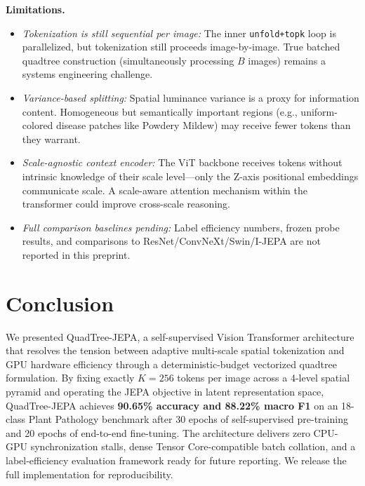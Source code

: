 \documentclass[10pt,twocolumn,letterpaper]{article}
\begin{document}
\textbf{Limitations.}
\begin{itemize}
    \item \textit{Tokenization is still sequential per image:} The inner \texttt{unfold+topk} loop is parallelized, but tokenization still proceeds image-by-image. True batched quadtree construction (simultaneously processing $B$ images) remains a systems engineering challenge.
    \item \textit{Variance-based splitting:} Spatial luminance variance is a proxy for information content. Homogeneous but semantically important regions (e.g., uniform-colored disease patches like Powdery Mildew) may receive fewer tokens than they warrant.
    \item \textit{Scale-agnostic context encoder:} The ViT backbone receives tokens without intrinsic knowledge of their scale level—only the Z-axis positional embeddings communicate scale. A scale-aware attention mechanism within the transformer could improve cross-scale reasoning.
    \item \textit{Full comparison baselines pending:} Label efficiency numbers, frozen probe results, and comparisons to ResNet/ConvNeXt/Swin/I-JEPA are not reported in this preprint.
\end{itemize}

\section{Conclusion}
\label{sec:conclusion}

We presented QuadTree-JEPA, a self-supervised Vision Transformer architecture that resolves the tension between adaptive multi-scale spatial tokenization and GPU hardware efficiency through a deterministic-budget vectorized quadtree formulation. By fixing exactly $K=256$ tokens per image across a 4-level spatial pyramid and operating the JEPA objective in latent representation space, QuadTree-JEPA achieves \textbf{90.65\% accuracy and 88.22\% macro F1} on an 18-class Plant Pathology benchmark after 30 epochs of self-supervised pre-training and 20 epochs of end-to-end fine-tuning. The architecture delivers zero CPU-GPU synchronization stalls, dense Tensor Core-compatible batch collation, and a label-efficiency evaluation framework ready for future reporting. We release the full implementation for reproducibility.

{\small


}
\end{document}
